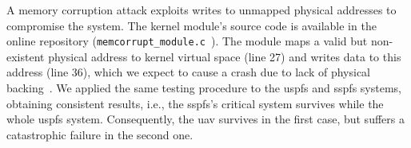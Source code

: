 
A memory corruption attack exploits writes to unmapped physical addresses to
compromise the system. The kernel module's source code is available in the
online repository (\lstinline{memcorrupt_module.c}~\cite{thesis-sw-github}).
The module maps a valid but non-existent physical address to kernel virtual
space (line 27) and writes data to this address (line 36), which we expect 
to cause a crash due to lack of physical backing~\cite{iomapLinux}.
We applied
the same testing procedure to the \gls{uspfs} and \gls{sspfs} systems, obtaining
consistent results, i.e., the \gls{sspfs}'s critical system survives while the
whole \gls{uspfs} system. Consequently, the \gls{uav} survives in the first
case, but suffers a catastrophic failure in the second one.




